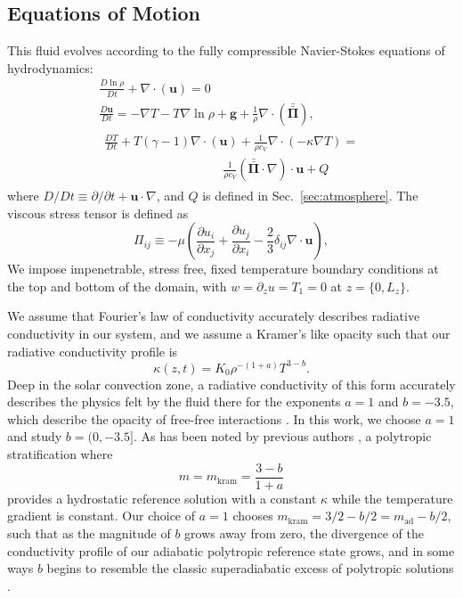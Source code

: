\documentclass[twocolumn, amsmath, amsfonts, amssymb]{aastex62}
\newcommand{\Div}[1]{\ensuremath{\nabla\cdot\left( #1\right)}}
\newcommand{\grad}{\ensuremath{\nabla}}
\newcommand{\stressT}{\ensuremath{\bm{\bar{\bar{\Pi}}}}}
\begin{document}
\subsection{Equations of Motion}
\label{sec:equations}
This fluid evolves according to the fully
compressible Navier-Stokes equations of hydrodynamics:
\begin{gather}
\frac{D \ln\rho}{D t} + \Div{\bm{u}} = 0
	\label{eqn:density_equation}
\\
\frac{D \bm{u}}{D t}  =
-\grad T - T \grad\ln\rho + \bm{g} + \frac{1}{\rho}\Div{\stressT}, 
	\label{eqn:momentum_equation}
\\
\begin{gathered}
\frac{D T}{D t} + T(\gamma - 1)\Div{\bm{u}}
+ \frac{1}{\rho c_V}\Div{-\kappa \grad T} = \\
\hspace{4cm}\frac{1}{\rho c_V}(\stressT\cdot\grad)\cdot\bm{u} + Q
	\label{eqn:energy_equation}
\end{gathered}
\end{gather}
where $D/Dt \equiv \partial/\partial t + \bm{u}\cdot\grad$, and $Q$ is
defined in Sec.~\ref{sec:atmosphere}. The
viscous stress tensor is defined as 
\begin{equation}
\Pi_{ij} \equiv -\mu \left(\frac{\partial u_i}{\partial x_j} + 
\frac{\partial u_j}{\partial x_i} - \frac{2}{3}\delta_{ij}\grad\cdot\bm{u}\right),
	\label{eqn:stress_tensor}
\end{equation}
We impose impenetrable, stress free, fixed temperature boundary conditions at
the top and bottom of the domain, with 
$w = \partial_z u = T_1 = 0$ at $z = \{0, L_z\}$. 


We assume that Fourier's law of conductivity \citep{lecoanet&all2014} accurately
describes radiative conductivity in our system, and we assume a Kramer's like
opacity such that our radiative conductivity profile is 
\citep{barekat&brandenburg2014, kapyla&all2017, kapyla&all2018}
\begin{equation}
\kappa(z, t) = K_0 \rho^{-(1+a)}T^{3-b}.
\end{equation}
Deep in the solar convection zone, a radiative conductivity of this form accurately
describes the physics felt by the fluid there for the exponents $a = 1$ and
$b = -3.5$, which describe the opacity of free-free interactions 
\citep{Cox&Giuli}. In this work, we choose $a = 1$ and study $b = (0, -3.5]$.
As has been noted by previous authors \citep{jones1976, edwards1990, barekat&brandenburg2014},
a polytropic stratification where
$$
m = m_{\text{kram}} = \frac{3-b}{1 + a}
$$
provides a hydrostatic reference solution with a constant $\kappa$ while the
temperature gradient is constant. Our choice of $a = 1$ chooses
$m_{\text{kram}} = 3/2 - b/2  = m_{\text{ad}} - b/2$, such that as the magnitude
of $b$ grows away from zero, the divergence of the 
conductivity profile of our adiabatic polytropic reference state grows, and in
some ways $b$ begins to resemble the classic superadiabatic excess of polytropic
solutions \citep{graham1975, anders&brown2017}.
\end{document}
